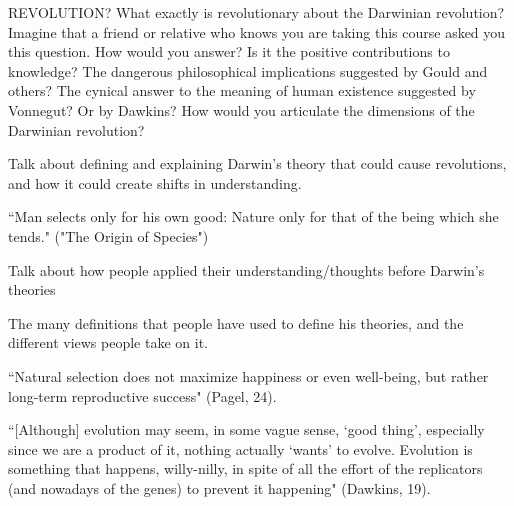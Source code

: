 \documentclass[11pt, oneside]{article}
\title{}
\author{Abhi Agarwal (abhia@nyu.edu)}
\date{}
\begin{document}
\maketitle

\par REVOLUTION? What exactly is revolutionary about the Darwinian revolution? Imagine that a friend
or relative who knows you are taking this course asked you this question. How would you answer? Is
it the positive contributions to knowledge? The dangerous philosophical implications suggested by
Gould and others? The cynical answer to the meaning of human existence suggested by Vonnegut?
Or by Dawkins? How would you articulate the dimensions of the Darwinian revolution?


\par Talk about defining and explaining Darwin's theory that could cause revolutions, and how it could create shifts in understanding.

``Man selects only for his own good: Nature only for that of the being which she tends." ("The Origin of Species")


\par Talk about how people applied their understanding/thoughts before Darwin's theories


% 

\par The many definitions that people have used to define his theories, and the different views people take on it. 

``Natural selection does not maximize happiness or even well-being, but rather long-term reproductive success" (Pagel, 24).

``[Although] evolution may seem, in some vague sense, `good thing', especially since we are a product of it, nothing actually `wants' to evolve. Evolution is something that happens, willy-nilly, in spite of all the effort of the replicators (and nowadays of the genes) to prevent it happening" (Dawkins, 19).
\end{document}
